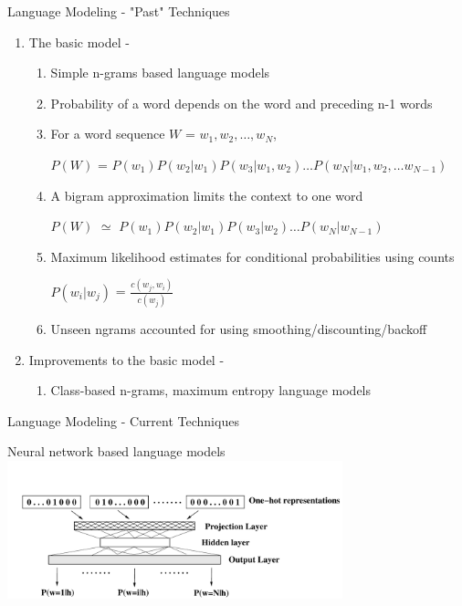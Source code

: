 \begin{frame}{Language Modeling - "Past" Techniques}
\begin{enumerate}
\item The \alert{basic} model \cite{jelinek1991up}-
	\begin{enumerate}
	\item Simple \alert{n-grams} based language models
	\item Probability of a word depends on the word and preceding n-1 words
	\item For a word sequence $W$ = $w_1,w_2,\dots,w_N$, \\
        \begin{center}$P(W)$ = $P(w_1)P(w_2|w_1)P(w_3|w_1,w_2)\dots P(w_N|w_1,w_2,\dots w_{N-1})$\end{center}
	\item A bigram approximation limits the context to one word \\
        \begin{center}$P(W)$ $\simeq$ $P(w_1)P(w_2|w_1)P(w_3|w_2)\dots P(w_N|w_{N-1})$\end{center}
        \item Maximum likelihood estimates for conditional probabilities using counts\\
        \begin{center}$P(w_i|w_j)$ = $\frac{c(w_j,w_i)}{c(w_j)}$\end{center}
	\item Unseen ngrams accounted for using smoothing/discounting/backoff
	\end{enumerate}
\item \alert{Improvements to the basic model} \cite{chen2009shrinking}-
	\begin{enumerate}
	\item Class-based n-grams, maximum entropy language models
	\end{enumerate}
\end{enumerate}
\end{frame}

\begin{frame}{Language Modeling - Current Techniques}
\begin{center}
Neural network based language models \cite{bengio2003neural,mikolov2011strategies}\\

\includegraphics[height=40mm]{figures/lm-mlp}
\end{center}
\end{frame}

